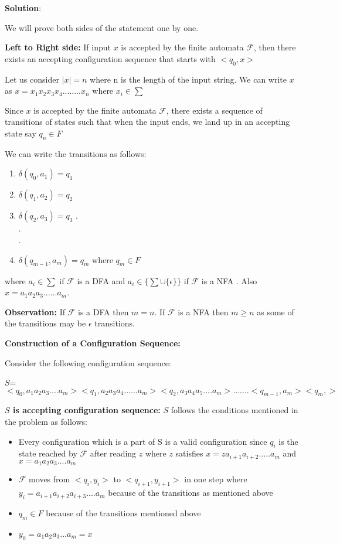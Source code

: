 \documentclass[12pt,a4paper]{article}
\begin{document}
\textbf{Solution}:

We will prove both sides of the statement one by one.

\textbf{Left to Right side:} If input $x$ is accepted by the finite automata $\mathcal{F}$, then there exists an accepting configuration sequence that starts with $<q_0,x>$

Let us consider $|x|=n$ where n is the length of the input string. We can write $x$ as $x=x_1x_2x_3x_4........x_n$ where $x_i \in \sum$ 

Since $x$ is accepted by the finite automata $\mathcal{F}$, there exists a sequence of transitions of states such that when the input ends, we land up in an accepting state say $q_n \in F$

We can write the transitions as follows:

\begin{enumerate}
    \item $\delta(q_0,a_1)=q_1$
    \item $\delta(q_1,a_2)=q_2$
    \item $\delta(q_2,a_3)=q_3$
    .\\
    .\\
    .\\
    \item $\delta(q_{m-1},a_m)=q_m$ where $q_m \in F$
\end{enumerate}

where $a_i \in \sum$ if $\mathcal{F}$ is a DFA and $a_i \in \{\sum \cup \{\epsilon\}\}$ if $\mathcal{F}$ is a NFA . Also $x= a_1a_2a_3......a_m$.

\textbf{Observation:} If $\mathcal{F}$ is a DFA then $m=n$. If $\mathcal{F}$ is a NFA then $m \geq n$ as some of the transitions may be $\epsilon$ transitions.


\textbf{Construction of a Configuration Sequence:}

Consider the following configuration sequence:

$S$=$<q_0,a_1a_2a_3....a_m><q_1,a_2a_3a_4......a_m><q_2,a_3a_4a_5....a_m>.......<q_{m-1},a_m><q_m,>$

\textbf{$S$ is accepting configuration sequence:}
$S$ follows the conditions mentioned in the problem as follows:
\begin{itemize}
    \item Every configuration which is a part of S is a valid configuration since $q_i$ is the state reached by $\mathcal{F}$ after reading $z$ where $z$ satisfies $x=za_{i+1}a_{i+2}.....a_{m}$ and $x=a_1a_2a_3....a_m$
    \item $\mathcal{F}$ moves from $<q_i,y_i>$ to $<q_{i+1},y_{i+1}>$ in one step where $y_i=a_{i+1}a_{i+2}a_{i+3}....a_m$ because of the transitions as mentioned above
    \item $q_m \in F$ because of the transitions mentioned above
    \item $y_0=a_1a_2a_3...a_m=x$
    
    
\end{itemize}
\end{document}
